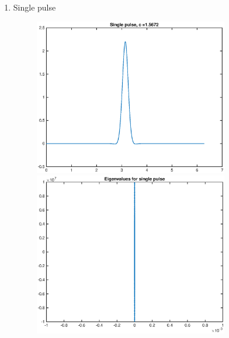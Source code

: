 \documentclass[12pt]{article}
\begin{document}
\begin{enumerate}
	\item Single pulse
	\begin{figure}[H]
	\includegraphics[width=8.5cm]{KdVsingle.eps}
	\includegraphics[width=8.5cm]{KdVsingleeig.eps}
	\end{figure}


\end{enumerate}
\end{document}
